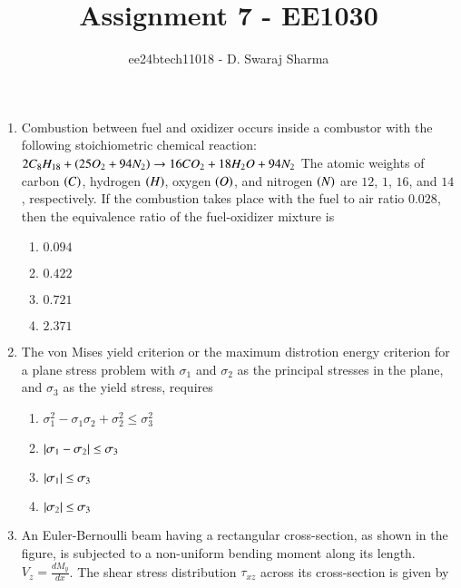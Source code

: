 \documentclass[journal]{IEEEtran}
\begin{document}

\vspace{3cm}

\title{Assignment 7 - EE1030}
\author{ee24btech11018 - D. Swaraj Sharma}

{\let\newpage\relax\maketitle}
\renewcommand{\thefigure}{\theenumi}
\renewcommand{\thetable}{\theenumi}
\setlength{\intextsep}{10pt}
\renewcommand{\thetable}{\theenumi}
\begin{enumerate}
	\item Combustion between fuel  and oxidizer  occurs inside a combustor with the following stoichiometric chemical reaction:
			$2C_8H_{18}+\left(25O_2+94N_2\right)\to16CO_2+18H_2O+94N_2$
		The atomic weights of carbon $\left(C\right)$, hydrogen $\left(H\right)$, oxygen $\left(O\right)$, and nitrogen $\left(N\right)$ are $12$, $1$, $16$, and $14$, respectively. If the combustion takes place with the fuel to air ratio $0.028$, then the equivalence ratio of the fuel-oxidizer mixture is
		\begin{enumerate}
			\item $0.094$
			\item $0.422$
			\item $0.721$
			\item $2.371$
		\end{enumerate}
	\item The von Mises yield criterion or the maximum distrotion energy criterion for a plane stress problem with $\sigma_1$ and $\sigma_2$ as the principal stresses in the plane, and $\sigma_3$ as the yield stress, requires
		\begin{enumerate}
			\item $\sigma_1^2-\sigma_1\sigma_2+\sigma_2^2\leq\sigma_3^2$
			\item $\left\vert\sigma_1-\sigma_2\right\vert \leq \sigma_3$
			\item $\left\vert\sigma_1\right\vert\leq\sigma_3$
			\item $\left\vert\sigma_2\right\vert\leq\sigma_3$
		\end{enumerate}
	\item An Euler-Bernoulli beam having a rectangular cross-section, as shown in the figure, is subjected to a non-uniform bending moment along its length. $V_z = \frac{dM_y}{dx}$. The shear stress distribution $\tau_{xz}$ across its cross-section is given by

\end{enumerate}
\end{document}
